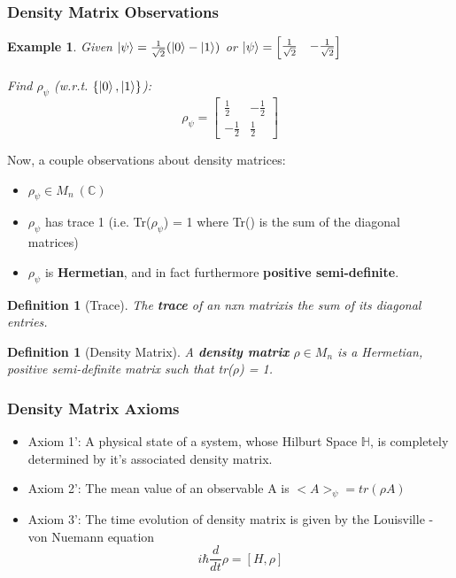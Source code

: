 \documentclass[12pt]{article}
\theoremstyle{plain}
\theoremstyle{nonumberplain}
\theoremstyle{plain}
\newtheorem{definition}[lemma]{Definition}
\newtheorem{example}[lemma]{Example}
\theoremstyle{nonumberplain}
\newcommand\1{{\bf 1}}
\newcommand{\bmat}[1]{\begin{bmatrix*} #1 \end{bmatrix*}} %
\newcommand{\C}{\mathbb{C}} %
\newcommand{\<}{\left\langle}
\renewcommand{\>}{\right\rangle}
\begin{document}
\subsubsection{Density Matrix Observations}

\begin{example} Given $\ket{\psi} = \frac{1}{\sqrt{2}}(\ket{0} - \ket{1})$ or $\ket{\psi} = \bmat{\frac{1}{\sqrt{2}} &-\frac{1}{\sqrt{2}}}$\\
\\
Find $\rho_\psi$ (w.r.t. $\{\ket{0}, \ket{1}\}$):
\begin{equation}
\rho_\psi = \bmat{\frac{1}{2} &-\frac{1}{2}\\ -\frac{1}{2} &\frac{1}{2}}
\end{equation}
\end{example}

Now, a couple observations about density matrices:
\begin{itemize}
\item $\rho_\psi \in M_n \ (\C)$
\item $\rho_\psi$ has trace 1 (i.e. Tr($\rho_\psi$) = 1 where Tr() is the sum of the diagonal matrices)
\item $\rho_\psi$ is \textbf{Hermetian}, and in fact furthermore \textbf{positive semi-definite}. 
\end{itemize}

\begin{definition} [Trace]
The \textbf{trace} of an nxn matrixis the sum of its diagonal entries.
\end{definition}


\begin{definition} [Density Matrix]
A \textbf{density matrix} $\rho \in M_n$ is a Hermetian, positive semi-definite matrix such that tr($\rho$) = 1.
\end{definition}

\subsubsection{Density Matrix Axioms}
\begin{itemize}
\item Axiom 1': A physical state of a system, whose Hilburt Space $\mathbb{H}$, is completely determined by it's associated density matrix. 
\item Axiom 2': The mean value of an observable A is $<A>_\psi = tr(\rho A)$
\item Axiom 3': The time evolution of density matrix is given by the Louisville - von Nuemann equation 
\begin{equation}
i\hbar \frac{d}{dt} \rho = [H,\rho]
\end{equation}
\end{itemize}
\end{document}

